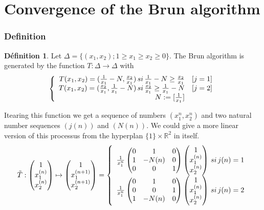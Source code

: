 \documentclass[12pt]{article}
\theoremstyle{plain}%
\theoremstyle{definition}
\newtheorem{dfnt}{Définition}[section]
\theoremstyle{remark}
\begin{document}
\part*{Convergence of the Brun algorithm}
\section{Definition}

\begin{dfnt}
Let $\Delta=\{(x_1,x_2); 1 \geq x_1 \geq x_2 \geq 0\}$. The Brun algorithm is generated by the function $T: \Delta \to \Delta$ with
\[
\left \{
\begin{array}{r c }
T(x_1,x_2)=(\frac{1}{x_1}-N,\frac{x_2}{x_1}) \, si \, \frac{1}{x_1}-N \geq \frac{x_2}{x_1} & [j=1] \\
T(x_1,x_2)=(\frac{x_2}{x_1},\frac{1}{x_1}-N) \, si \, \frac{x_2}{x_1} \geq  \frac{1}{x_1}-N & [j=2] \\
N:=[\frac{1}{x_1}]
\end{array}
\right .
\]
\end{dfnt}
Itearing this function we get a sequence of numbers $(x_1^n,x_2^n)$ and two natural number sequences $(j(n))$ and $(N(n))$.
We could give a more linear version of this processus from the hyperplan $ \{1 \} \times \mathbb{R}^2  $ in itself.
\[
\tilde{T}:\begin{pmatrix} 1 \\ x_1^{(n)} \\ x_2^{(n)} \end{pmatrix} \mapsto \begin{pmatrix} 1 \\ x_1^{(n+1)} \\ x_2^{(n+1)} \end{pmatrix} = \left \{
\begin{array}{r c}
\frac{1}{x_1^n}\begin{pmatrix} 0 & 1 & 0 \\1 & -N(n) & 0 \\0 & 0& 1 \end{pmatrix} \begin{pmatrix} 1 \\ x_1^{(n)} \\ x_2^{(n)} \end{pmatrix} \, si \, j(n)=1\\
\frac{1}{x_1^n}\begin{pmatrix} 0 & 1 & 0 \\0 & 0 & 1 \\1 & -N(n) & 0 \end{pmatrix} \begin{pmatrix} 1 \\ x_1^{(n)} \\ x_2^{(n)} \end{pmatrix}\, si \, j(n)=2\\
\end{array}
\right .
\]
\end{document}
